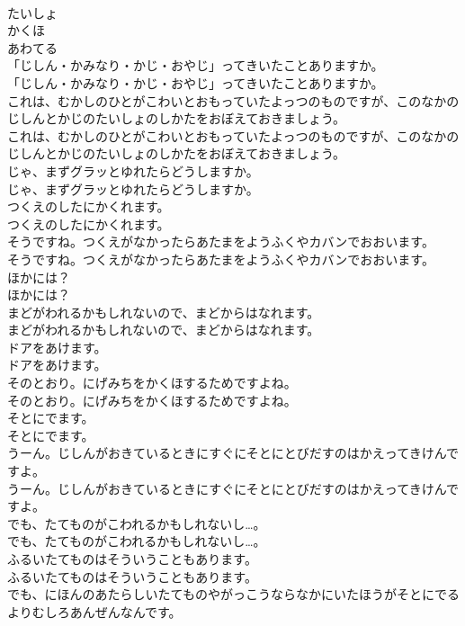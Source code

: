 \documentclass[8pt]{extreport}
\begin{document}
\begin{CJK}{UTF8}{min}
\\	たいしょ
\\	かくほ
\\	あわてる
\\	「じしん・かみなり・かじ・おやじ」ってきいたことありますか。
\\	「じしん・かみなり・かじ・おやじ」ってきいたことありますか。
\\	これは、むかしのひとがこわいとおもっていたよっつのものですが、このなかのじしんとかじのたいしょのしかたをおぼえておきましょう。
\\	これは、むかしのひとがこわいとおもっていたよっつのものですが、このなかのじしんとかじのたいしょのしかたをおぼえておきましょう。
\\	じゃ、まずグラッとゆれたらどうしますか。
\\	じゃ、まずグラッとゆれたらどうしますか。
\\	つくえのしたにかくれます。
\\	つくえのしたにかくれます。
\\	そうですね。つくえがなかったらあたまをようふくやカバンでおおいます。
\\	そうですね。つくえがなかったらあたまをようふくやカバンでおおいます。
\\	ほかには？
\\	ほかには？
\\	まどがわれるかもしれないので、まどからはなれます。
\\	まどがわれるかもしれないので、まどからはなれます。
\\	ドアをあけます。
\\	ドアをあけます。
\\	そのとおり。にげみちをかくほするためですよね。
\\	そのとおり。にげみちをかくほするためですよね。
\\	そとにでます。
\\	そとにでます。
\\	うーん。じしんがおきているときにすぐにそとにとびだすのはかえってきけんですよ。
\\	うーん。じしんがおきているときにすぐにそとにとびだすのはかえってきけんですよ。
\\	でも、たてものがこわれるかもしれないし…。
\\	でも、たてものがこわれるかもしれないし…。
\\	ふるいたてものはそういうこともあります。
\\	ふるいたてものはそういうこともあります。
\\	でも、にほんのあたらしいたてものやがっこうならなかにいたほうがそとにでるよりむしろあんぜんなんです。

\end{CJK}
\end{document}
